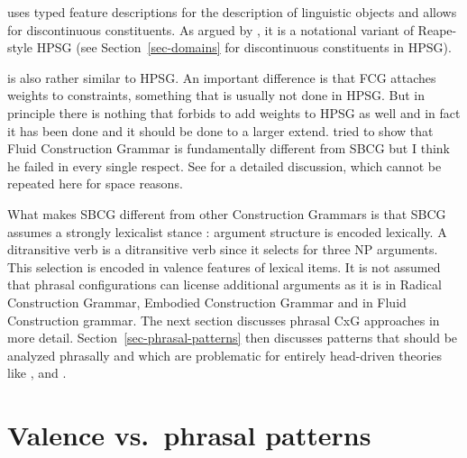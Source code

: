 \documentclass[output=paper]{langsci/langscibook}
\begin{document}
 \citep{BC2005a} uses typed feature descriptions for the description of
linguistic objects and allows for discontinuous constituents. As
argued by \citet[Section~10.6.3]{MuellerGT-Eng1}, it is a notational variant of Reape-style HPSG
\citep{Reape94a} (see Section~\ref{sec-domains} for discontinuous constituents in HPSG).

 is also rather similar to HPSG. An important difference is that FCG attaches
weights to constraints, something that is usually not done in HPSG. But in principle there is
nothing that forbids to add weights to HPSG as well and in fact it has been done and it should be
done to a larger extend.  tried to show that
Fluid Construction Grammar is fundamentally different from SBCG but I think he failed in every
single respect. See  for a detailed discussion, which cannot be repeated here for
space reasons.

What makes SBCG different from other Construction Grammars is that SBCG assumes a strongly
lexicalist stance \citep{SW2011a}: argument structure is encoded lexically. A ditransitive verb is a
ditransitive verb since it selects for three NP arguments. This selection is encoded in valence
features of lexical items. It is not assumed that phrasal configurations can license additional
arguments as it is in Radical Construction Grammar, Embodied Construction Grammar and in Fluid
Construction grammar. The next section discusses phrasal CxG approaches in more
detail. Section~\ref{sec-phrasal-patterns} then discusses patterns that should be analyzed phrasally
and which are problematic for entirely head-driven theories like ,
 and .



\section{Valence vs.\ phrasal patterns}
\label{sec-valence}
\end{document}
